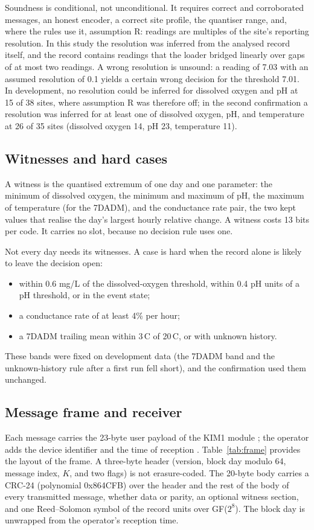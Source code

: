 Soundness is conditional, not unconditional. It requires correct and corroborated messages, an honest encoder, a correct site profile, the quantiser range, and, where the rules use it, assumption R: readings are multiples of the site's reporting resolution. In this study the resolution was inferred from the analysed record itself, and the record contains readings that the loader bridged linearly over gaps of at most two readings. A wrong resolution is unsound: a reading of 7.03 with an assumed resolution of 0.1 yields a certain wrong decision for the threshold 7.01. In development, no resolution could be inferred for dissolved oxygen and pH at 15 of 38 sites, where assumption R was therefore off; in the second confirmation a resolution was inferred for at least one of dissolved oxygen, pH, and temperature at 26 of 35 sites (dissolved oxygen 14, pH 23, temperature 11).

\subsection{Witnesses and hard cases}
\label{sec:witness}
A witness is the quantised extremum of one day and one parameter: the minimum of dissolved oxygen, the minimum and maximum of pH, the maximum of temperature (for the 7DADM), and the conductance rate pair, the two kept values that realise the day's largest hourly relative change. A witness costs 13 bits per code. It carries no slot, because no decision rule uses one.

Not every day needs its witnesses. A case is hard when the record alone is likely to leave the decision open:
\begin{itemize}
  \item within 0.6 mg/L of the dissolved-oxygen threshold, within 0.4 pH units of a pH threshold, or in the event state;
  \item a conductance rate of at least 4\% per hour;
  \item a 7DADM trailing mean within 3\,\textdegree C of 20\,\textdegree C, or with unknown history.
\end{itemize}
These bands were fixed on development data (the 7DADM band and the unknown-history rule after a first run fell short), and the confirmation used them unchanged.

\subsection{Message frame and receiver}
\label{sec:frame}
Each message carries the 23-byte user payload of the KIM1 module \citep{kineis2023kim1}; the operator adds the device identifier and the time of reception \citep{kineis2024formats}. Table~\ref{tab:frame} provides the layout of the frame. A three-byte header (version, block day modulo 64, message index, $K$, and two flags) is not erasure-coded. The 20-byte body carries a CRC-24 (polynomial 0x864CFB) over the header and the rest of the body of every transmitted message, whether data or parity, an optional witness section, and one Reed--Solomon symbol of the record units over GF($2^8$). The block day is unwrapped from the operator's reception time.

